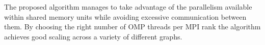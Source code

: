 The proposed algorithm manages to take advantage of the parallelism available within shared memory units while avoiding excessive communication between them. By choosing the right number of OMP threads per MPI rank the algorithm achieves good scaling across a variety of different graphs.
